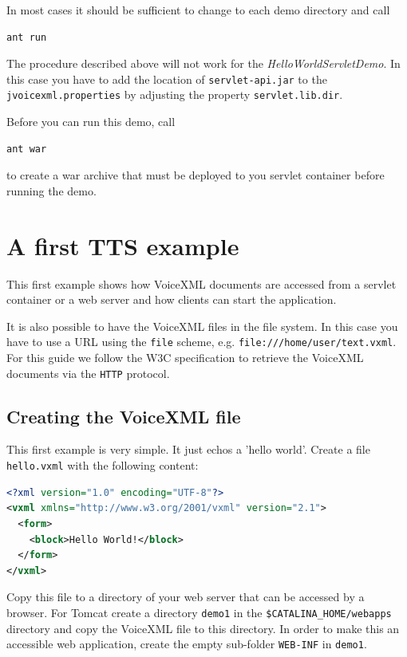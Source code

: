 \documentclass[11pt,a4paper]{article}
\begin{document}
In most cases it should be sufficient to change to each demo directory
and call

\begin{lstlisting}
ant run
\end{lstlisting}

The procedure described above will not work for the
\emph{HelloWorldServletDemo}. In this case you have to add the location of
\texttt{servlet-api.jar} to the \texttt{jvoicexml.properties} by adjusting the
property \texttt{servlet.lib.dir}.

Before you can run this demo, call

\begin{lstlisting}
ant war
\end{lstlisting}

to create a war archive that must be deployed to you servlet container
before running the demo.

\section{A first TTS example}
\label{sec:first-tts-example}

This first example shows how VoiceXML documents are accessed from a
servlet container or a web server and how clients can start the application.

It is also possible to have the VoiceXML files in the file system. In this case
you have to use a URL using the \lstinline{file} scheme, e.g.
\lstinline{file:///home/user/text.vxml}. For this guide we follow the W3C
specification to retrieve the VoiceXML documents via the \lstinline{HTTP}
protocol.

\subsection{Creating the VoiceXML file}
\label{sec:hello-vxml}

This first example is very simple. It just echos a 'hello world'.
Create a file \texttt{hello.vxml} with the following content:

\begin{lstlisting}[language=XML]
<?xml version="1.0" encoding="UTF-8"?> 
<vxml xmlns="http://www.w3.org/2001/vxml" version="2.1">
  <form>
    <block>Hello World!</block>
  </form>
</vxml>
\end{lstlisting}

Copy this file to a directory of your web server that can be accessed
by a browser. For Tomcat create a directory \texttt{demo1} in
the \texttt{\$CATALINA\_HOME/web\-apps} directory and copy the VoiceXML
file to this directory. In order to make this
an accessible web application, create the empty sub-folder \texttt{WEB-INF}
in \texttt{demo1}.
\end{document}
